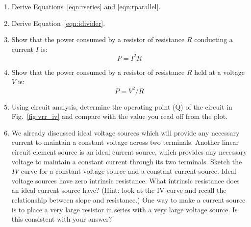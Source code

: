 \documentclass[12pt,oneside]{book}
\begin{document}
\begin{enumerate}

\item Derive Equations~\ref{eqn:rseries} and \ref{eqn:rparallel}.

\item Derive Equation~\ref{eqn:idivider}.

\item Show that the power consumed by a resistor of resistance $R$ conducting a current $I$ is:
\begin{displaymath}
P = I^2R
\end{displaymath}

\item Show that the power consumed by a resistor of resistance $R$ held at a voltage $V$ is:
\begin{displaymath}
P = V^2/R
\end{displaymath}

\item Using circuit analysis, determine the operating point (Q) of the
  circuit in Fig.~\ref{fig:vrr_iv} and compare with the value you read
  off from the plot.



\item We already discussed ideal voltage sources which will provide
  any necessary current to maintain a constant voltage across two
  terminals.  Another linear circuit element source is an ideal
  current source, which provides any necessary voltage to maintain a
  constant current through its two terminals.  Sketch the $IV$ curve
  for a constant voltage source and a constant current source.  Ideal
  voltage sources have zero intrinsic resistance.  What intrinsic
  resistance does an ideal current source have?  (Hint: look at the IV
  curve and recall the relationship between slope and resistance.)
  One way to make a current source is to place a very large resistor
  in series with a very large voltage source.  Is this consistent with
  your answer?



\end{enumerate}
\end{document}
